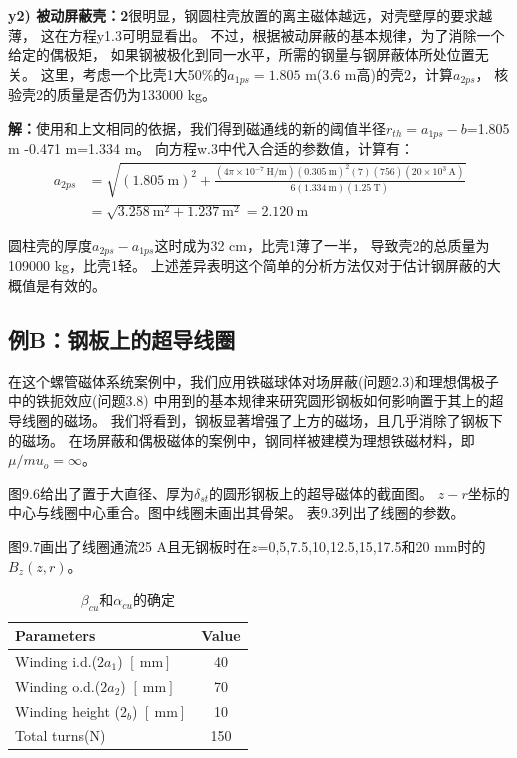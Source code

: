 \textbf{y2) 被动屏蔽壳：2}\qquad 很明显，钢圆柱壳放置的离主磁体越远，对壳壁厚的要求越薄，
这在方程y1.3可明显看出。
不过，根据被动屏蔽的基本规律，为了消除一个给定的偶极矩，
如果钢被极化到同一水平，所需的钢量与钢屏蔽体所处位置无关。
这里，考虑一个比壳1大50\%的$a_{1ps}=1.805$ m(3.6 m高)的壳2，计算$a_{2ps}$，
核验壳2的质量是否仍为133000 kg。

\textbf{解：}使用和上文相同的依据，我们得到磁通线的新的阈值半径$r_{th}=a_{1ps}-b$=1.805 m
-0.471 m=1.334 m。
向方程w.3中代入合适的参数值，计算有：
\begin{align*}%
a_{2ps}&=\sqrt{(1.805\ \mathrm{m})^2+\frac{(4\pi\times 10^{-7}\ \mathrm{H/m})(0.305\ \mathrm{m})^2(7)(756)(20\times 10^3\ \mathrm{A})}{6(1.334\ \mathrm{m})(1.25\ \mathrm{T})}}\\
&=\sqrt{3.258\ \mathrm{m^2}+1.237\ \mathrm{m^2}}=2.120\ \mathrm{m}
\end{align*}

圆柱壳的厚度$a_{2ps}-a_{1ps}$这时成为32 cm，比壳1薄了一半，
导致壳2的总质量为109000 kg，比壳1轻。
上述差异表明这个简单的分析方法仅对于估计钢屏蔽的大概值是有效的。


\subsection{例B：钢板上的超导线圈}
在这个螺管磁体系统案例中，我们应用铁磁球体对场屏蔽(问题2.3)和理想偶极子中的铁扼效应(问题3.8)
中用到的基本规律来研究圆形钢板如何影响置于其上的超导线圈的磁场。
我们将看到，钢板显著增强了上方的磁场，且几乎消除了钢板下的磁场。
在场屏蔽和偶极磁体的案例中，钢同样被建模为理想铁磁材料，即$\mu/mu_o=\infty$。

图9.6给出了置于大直径、厚为$\delta_{st}$的圆形钢板上的超导磁体的截面图。
$z-r$坐标的中心与线圈中心重合。图中线圈未画出其骨架。
表9.3列出了线圈的参数。

图9.7画出了线圈通流25 A且无钢板时在$z$=0,5,7.5,10,12.5,15,17.5和20 mm时的$B_z(z,r)$。

\begin{table}[htbp]\small
\centering
\caption{$\beta_{cu}$和$\alpha_{cu}$的确定}  
\begin{tabular}{|l|c|}
\hline
Parameters & Value \\ \hline
Winding i.d.($2a_1$) $\left[\ \mathrm{mm}\right]$ & 40 \\ \hline
Winding o.d.($2a_2$) $\left[\ \mathrm{mm}\right]$ & 70 \\ \hline
Winding height ($2_b$) $\left[\ \mathrm{mm}\right]$ & 10 \\ \hline
Total turns(N) & 150 \\ \hline
\end{tabular}
\end{table}



